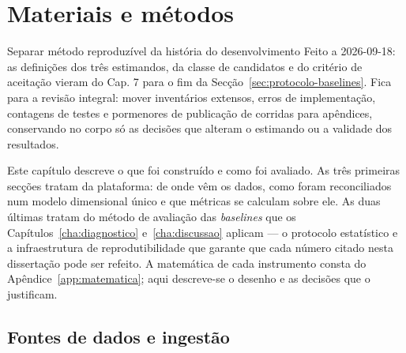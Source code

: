 
\chapter{Materiais e métodos}
\label{cha:metodos}
{Separar método reproduzível da história do desenvolvimento}
{Feito a 2026-09-18: as definições dos três estimandos, da classe de
candidatos e do critério de aceitação vieram do Cap. 7 para o fim da
Secção~\ref{sec:protocolo-baselines}. Fica para a revisão integral: mover
inventários extensos, erros de implementação, contagens de testes e
pormenores de publicação de corridas para apêndices, conservando no corpo
só as decisões que alteram o estimando ou a validade dos resultados.}%

Este capítulo descreve o que foi construído e como foi avaliado. As três
primeiras secções tratam da plataforma: de onde vêm os dados, como foram
reconciliados num modelo dimensional único e que métricas se calculam sobre
ele. As duas últimas tratam do método de avaliação das \emph{baselines} que
os Capítulos~\ref{cha:diagnostico} e~\ref{cha:discussao} aplicam --- o
protocolo estatístico e a infraestrutura de reprodutibilidade que garante
que cada número citado nesta dissertação pode ser refeito. A matemática de
cada instrumento consta do Apêndice~\ref{app:matematica}; aqui descreve-se o
desenho e as decisões que o justificam.

\section{Fontes de dados e ingestão}
\label{sec:fontes}

